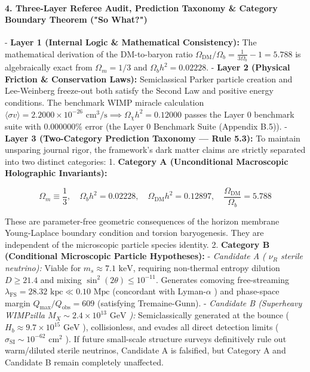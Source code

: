 \documentclass[11pt,a4paper]{article}
\theoremstyle{definition}\newtheorem{definition}{Definition}
\theoremstyle{remark}\newtheorem{remark}{Remark}
\begin{document}
\paragraph{4. Three-Layer Referee Audit, Prediction Taxonomy \& Category Boundary Theorem ("So What?")}

- \textbf{Layer 1 (Internal Logic \& Mathematical Consistency):} The mathematical derivation of the DM-to-baryon ratio $\Omega_{\text{DM}}/\Omega_b = \frac{1}{3\Omega_b} - 1 = 5.788$ is algebraically exact from $\Omega_m = 1/3$ and $\Omega_b h^2 = 0.02228$.
- \textbf{Layer 2 (Physical Friction \& Conservation Laws):} Semiclassical Parker particle creation and Lee-Weinberg freeze-out both satisfy the Second Law and positive energy conditions. The benchmark WIMP miracle calculation $\langle \sigma v \rangle = 2.2000 \times 10^{-26}\text{ cm}^3/\text{s} \implies \Omega_\chi h^2 = 0.12000$ passes the Layer 0 benchmark suite with $0.000000\%$ error (the Layer 0 Benchmark Suite (Appendix B.5)).
- \textbf{Layer 3 (Two-Category Prediction Taxonomy — Rule 5.3):}
To maintain unsparing journal rigor, the framework's dark matter claims are strictly separated into two distinct categories:
1. \textbf{Category A (Unconditional Macroscopic Holographic Invariants):}


\begin{equation}
\Omega_m \equiv \frac{1}{3}, \quad \Omega_b h^2 = 0.02228, \quad \Omega_{\text{DM}} h^2 = 0.12897, \quad \frac{\Omega_{\text{DM}}}{\Omega_b} = 5.788
\end{equation}


These are parameter-free geometric consequences of the horizon membrane Young-Laplace boundary condition and torsion baryogenesis. They are independent of the microscopic particle species identity.
2. \textbf{Category B (Conditional Microscopic Particle Hypotheses):}
- \textit{Candidate A ( $\nu_R$ sterile neutrino):} Viable for $m_s \approx 7.1\text{ keV}$, requiring non-thermal entropy dilution $D \ge 21.4$ and mixing $\sin^2(2\theta) \le 10^{-11}$. Generates comoving free-streaming $\lambda_{\text{FS}} = 28.32\text{ kpc} \ll 0.10\text{ Mpc}$ (concordant with Lyman-$\alpha$ ) and phase-space margin $Q_{\text{max}}/Q_{\text{obs}} = 609$ (satisfying Tremaine-Gunn).
- \textit{Candidate B (Superheavy WIMPzilla $M_X \sim 2.4 \times 10^{13}\text{ GeV}$ ):} Semiclassically generated at the bounce ( $H_b \approx 9.7 \times 10^{15}\text{ GeV}$ ), collisionless, and evades all direct detection limits ( $\sigma_{\text{SI}} \sim 10^{-62}\text{ cm}^2$ ).
If future small-scale structure surveys definitively rule out warm/diluted sterile neutrinos, Candidate A is falsified, but Category A and Candidate B remain completely unaffected.
\end{document}
